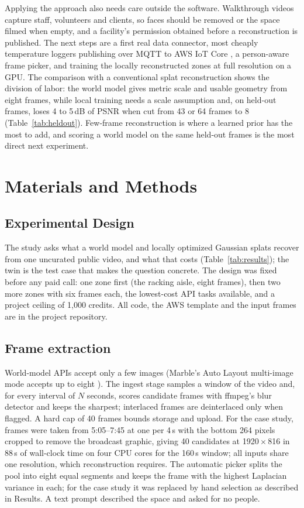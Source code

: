 \documentclass{article}
\begin{document}
Applying the approach also needs care outside the software. Walkthrough
videos capture staff, volunteers and clients, so faces should be removed or the
space filmed when empty, and a facility's permission obtained before a
reconstruction is published. The next steps are a first real data connector,
most cheaply temperature loggers publishing over MQTT to AWS IoT Core
\cite{awsiotcore}, a person-aware frame picker, and training the locally reconstructed zones at full resolution on a GPU. The
comparison with a conventional splat reconstruction shows the division of
labor: the world model gives metric scale and usable geometry from eight
frames, while local training needs a scale assumption and, on held-out frames,
loses 4 to 5\,dB of PSNR when cut from 43 or 64 frames to 8
(Table~\ref{tab:heldout}). Few-frame reconstruction is where a learned prior
has the most to add, and scoring a world model on the same held-out frames is
the most direct next experiment.

\section{Materials and Methods}

\subsection{Experimental Design}
The study asks what a world model and locally optimized Gaussian splats
recover from one uncurated public video, and what that costs
(Table~\ref{tab:results}); the twin is the test case that makes the
question concrete.
The design was fixed before any paid call: one zone first (the racking aisle,
eight frames), then two more zones with six frames each, the lowest-cost API
tasks available, and a project ceiling of 1{,}000 credits. All code, the AWS template and the input
frames are in the project repository.

\subsection{Frame extraction}
World-model APIs accept only a few images (Marble's Auto Layout multi-image mode
accepts up to eight \cite{worldlabs_multiimage}). The ingest
stage samples a window of the video and, for every interval of $N$ seconds,
scores candidate frames with ffmpeg's blur detector and keeps the sharpest;
interlaced frames are deinterlaced only when flagged. A hard cap of 40 frames
bounds storage and upload. For the case study, frames were taken from
5:05--7:45 at one per 4\,s with the bottom 264 pixels cropped to remove the
broadcast graphic, giving 40 candidates at 1920\,$\times$\,816 in 88\,s of wall-clock time on
four CPU cores for the 160\,s window; all inputs
share one resolution, which reconstruction requires. The automatic picker
splits the pool into eight equal segments and keeps the frame with the highest
Laplacian variance in each; for the case study it was replaced by hand
selection as described in Results. A text prompt described the space and asked
for no people.
\end{document}
